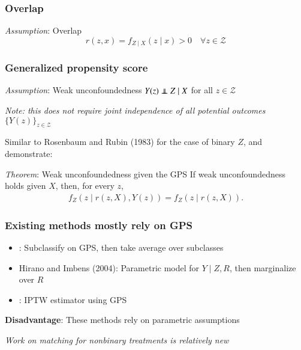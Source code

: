 
\begin{frame}
  \frametitle{Overlap}
  
  \begin{block}{\textit{Assumption}: Overlap}
    $$r(z, x) = f_{Z \mid X}(z \mid x) > 0 \quad \forall z \in \mathcal{Z}$$
  \end{block}
  
\end{frame}


\begin{frame}
  \frametitle{Generalized propensity score}

    \begin{block}{\textit{Assumption}: Weak unconfoundedness}
    $Y(z) \ind Z \mid X$ for all $z \in \mathcal{Z}$ \smallskip

    \footnotesize \emph{Note: this does not require joint independence of all
    potential outcomes $\{Y(z)\}_{z\in \mathcal{Z}}$} \normalsize
  \end{block}

  Similar to Rosenbaum and Rubin (1983) for the case of binary $Z$,
  \cite{Imbens2000} and \cite{Hirano2004} demonstrate:

  \begin{block}{\textit{Theorem}: Weak unconfoundedness given the GPS}
    If weak unconfoundedness holds given $X$, then, for every $z$,
    \begin{align*}
      f_{Z}(z \mid r(z, X), Y(z)) = f_{Z}(z \mid r(z, X)).
    \end{align*}

  \end{block}
  
  
\end{frame}

\begin{frame}
  \frametitle{Existing methods mostly rely on GPS}
  
  \begin{itemize}
  \item \cite{imai2004}: Subclassify on GPS, then take average over
    subclasses \medskip 
  \item Hirano and Imbens (2004): Parametric model for $Y \mid Z, R$,
    then marginalize over $R$ \medskip 
  \item \cite{robins2000marginal}: IPTW estimator using GPS
    \medskip
  \end{itemize}

  \textbf{Disadvantage}: These methods rely on parametric assumptions
  \bigskip

  \emph{Work on matching for nonbinary treatments is relatively new}

\end{frame}

